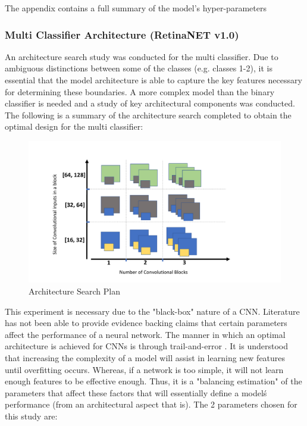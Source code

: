 \documentclass[a4paper]{article}
\begin{document}
            The appendix contains a full summary of the model's hyper-parameters

        \subsubsection{Multi Classifier Architecture (RetinaNET v1.0)}
            An architecture search study was conducted for the multi classifier. Due to ambiguous distinctions between some of the classes (e.g. classes 1-2), it is essential that the model architecture is able to capture the key features necessary for determining these boundaries. A more complex model than the binary classifier is needed and a study of key architectural components was conducted. The following is a summary of the architecture search completed to obtain the optimal design for the multi classifier:
            \vspace{3mm}
            \pagebreak

            \begin{figure}[h!]
                \centerline{\includegraphics[width=1\textwidth]{../img/map.pdf}}
                \label{figX: Architecture Search Plan} 
                \caption{Architecture Search Plan}
            \end{figure}

            This experiment is necessary due to the "black-box" nature of a CNN. Literature has not been able to provide evidence backing claims that certain parameters affect the performance of a neural network. The manner in which an optimal architecture is achieved for CNNs is through trail-and-error \cite{RN13}. It is understood that increasing the complexity of a model will assist in learning new features until overfitting occurs. Whereas, if a network is too simple, it will not learn enough features to be effective enough. Thus, it is a "balancing estimation" of the parameters that affect these factors that will essentially define a model\'s performance (from an architectural aspect that is). The 2 parameters chosen for this study are:
\end{document}
